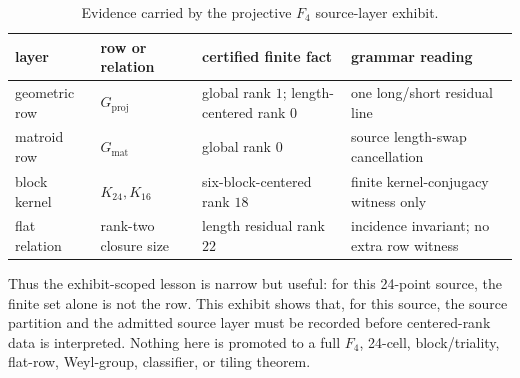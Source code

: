 \begin{table}[!htbp]
\centering
\caption{Evidence carried by the projective \(F_4\) source-layer exhibit.}
\label{tab:f4-source-layer}
\begin{tabular}{@{}L{0.20\textwidth}L{0.23\textwidth}L{0.25\textwidth}L{0.24\textwidth}@{}}
\toprule
layer & row or relation & certified finite fact & grammar reading \\
\midrule
geometric row & \(G_{\mathrm{proj}}\) & global rank \(1\); length-centered rank \(0\) & one long/short residual line \\
matroid row & \(G_{\mathrm{mat}}\) & global rank \(0\) & source length-swap cancellation \\
block kernel & \(K_{24},K_{16}\) & six-block-centered rank \(18\) & finite kernel-conjugacy witness only \\
flat relation & rank-two closure size & length residual rank \(22\) & incidence invariant; no extra row witness \\
\bottomrule
\end{tabular}
\end{table}

Thus the exhibit-scoped lesson is narrow but useful: for this 24-point source, the finite set alone is not the row.  This exhibit shows that, for this source, the source partition and the admitted source layer must be recorded before centered-rank data is interpreted.  Nothing here is promoted to a full \(F_4\), 24-cell, block/triality, flat-row, Weyl-group, classifier, or tiling theorem.